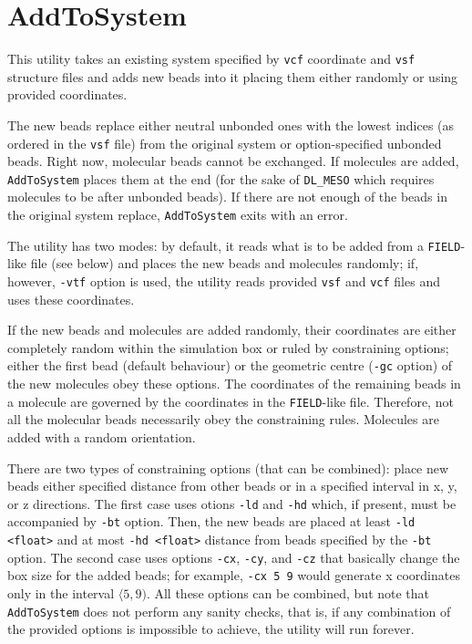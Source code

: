 \section{AddToSystem} \label{sec:AddToSystem}

This utility takes an existing system specified by \texttt{vcf} coordinate
and \texttt{vsf} structure files and adds new beads into it placing them
either randomly or using provided coordinates.

The new beads replace either neutral unbonded ones with the lowest indices
(as ordered in the \texttt{vsf} file) from the original system or
option-specified unbonded beads. Right now, molecular beads cannot be
exchanged. If molecules are added, \texttt{AddToSystem} places them at the
end (for the sake of \texttt{DL\_MESO} which requires molecules to be after
unbonded beads). If there are not enough of the beads in the original system
replace, \texttt{AddToSystem} exits with an error.

The utility has two modes: by default, it reads what is to be added from a
\texttt{FIELD}-like file (see below) and places the new beads and molecules
randomly; if, however, \texttt{-vtf} option is used, the utility reads
provided \texttt{vsf} and \texttt{vcf} files and uses these coordinates.

If the new beads and molecules are added randomly, their coordinates are
either completely random within the simulation box or ruled by constraining
options; either the first bead (default behaviour) or the geometric centre
(\texttt{-gc} option) of the new molecules obey these options. The
coordinates of the remaining beads in a molecule are governed by the
coordinates in the \texttt{FIELD}-like file. Therefore, not all the
molecular beads necessarily obey the constraining rules. Molecules are
added with a random orientation.

There are two types of constraining options (that can be combined): place
new beads either specified distance from other beads or in a specified
interval in x, y, or z directions. The first case uses otions \texttt{-ld}
and \texttt{-hd} which, if present, must be accompanied by \texttt{-bt}
option.  Then, the new beads are placed at least \texttt{-ld <float>} and
at most \texttt{-hd <float>} distance from beads specified by the
\texttt{-bt} option. The second case uses options \texttt{-cx},
\texttt{-cy}, and \texttt{-cz} that basically change the box size for the
added beads; for example, \texttt{-cx 5 9} would generate x coordinates
only in the interval $\langle5,9)$. All these options can be combined, but note that
\texttt{AddToSystem} does not perform any sanity checks, that is, if any
combination of the provided options is impossible to achieve, the utility
will run forever.

